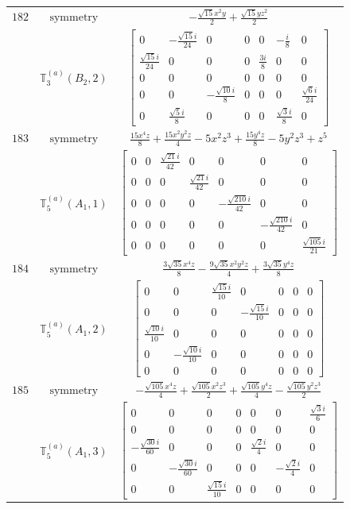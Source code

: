 \documentclass[fleqn,8pt,landscape]{jsarticle}
\begin{document}
\begin{longtable}{ccc}
$ 182 $ & $ \text{symmetry} $ & $ - \frac{\sqrt{15} x^{2} y}{2} + \frac{\sqrt{15} y z^{2}}{2} $ \\
$  $ & $ \mathbb{T}_{3}^{(a)}(B_{2},2) $ & $ \begin{bmatrix} 0 & - \frac{\sqrt{15} i}{24} & 0 & 0 & 0 & - \frac{i}{8} & 0 \\ \frac{\sqrt{15} i}{24} & 0 & 0 & 0 & \frac{3 i}{8} & 0 & 0 \\ 0 & 0 & 0 & 0 & 0 & 0 & 0 \\ 0 & 0 & - \frac{\sqrt{10} i}{8} & 0 & 0 & 0 & \frac{\sqrt{6} i}{24} \\ 0 & \frac{\sqrt{5} i}{8} & 0 & 0 & 0 & \frac{\sqrt{3} i}{8} & 0 \end{bmatrix} $ \\ \hline
$ 183 $ & $ \text{symmetry} $ & $ \frac{15 x^{4} z}{8} + \frac{15 x^{2} y^{2} z}{4} - 5 x^{2} z^{3} + \frac{15 y^{4} z}{8} - 5 y^{2} z^{3} + z^{5} $ \\
$  $ & $ \mathbb{T}_{5}^{(a)}(A_{1},1) $ & $ \begin{bmatrix} 0 & 0 & \frac{\sqrt{21} i}{42} & 0 & 0 & 0 & 0 \\ 0 & 0 & 0 & \frac{\sqrt{21} i}{42} & 0 & 0 & 0 \\ 0 & 0 & 0 & 0 & - \frac{\sqrt{210} i}{42} & 0 & 0 \\ 0 & 0 & 0 & 0 & 0 & - \frac{\sqrt{210} i}{42} & 0 \\ 0 & 0 & 0 & 0 & 0 & 0 & \frac{\sqrt{105} i}{21} \end{bmatrix} $ \\ \hline
$ 184 $ & $ \text{symmetry} $ & $ \frac{3 \sqrt{35} x^{4} z}{8} - \frac{9 \sqrt{35} x^{2} y^{2} z}{4} + \frac{3 \sqrt{35} y^{4} z}{8} $ \\
$  $ & $ \mathbb{T}_{5}^{(a)}(A_{1},2) $ & $ \begin{bmatrix} 0 & 0 & \frac{\sqrt{15} i}{10} & 0 & 0 & 0 & 0 \\ 0 & 0 & 0 & - \frac{\sqrt{15} i}{10} & 0 & 0 & 0 \\ \frac{\sqrt{10} i}{10} & 0 & 0 & 0 & 0 & 0 & 0 \\ 0 & - \frac{\sqrt{10} i}{10} & 0 & 0 & 0 & 0 & 0 \\ 0 & 0 & 0 & 0 & 0 & 0 & 0 \end{bmatrix} $ \\ \hline
$ 185 $ & $ \text{symmetry} $ & $ - \frac{\sqrt{105} x^{4} z}{4} + \frac{\sqrt{105} x^{2} z^{3}}{2} + \frac{\sqrt{105} y^{4} z}{4} - \frac{\sqrt{105} y^{2} z^{3}}{2} $ \\
$  $ & $ \mathbb{T}_{5}^{(a)}(A_{1},3) $ & $ \begin{bmatrix} 0 & 0 & 0 & 0 & 0 & 0 & \frac{\sqrt{3} i}{6} \\ 0 & 0 & 0 & 0 & 0 & 0 & 0 \\ - \frac{\sqrt{30} i}{60} & 0 & 0 & 0 & \frac{\sqrt{2} i}{4} & 0 & 0 \\ 0 & - \frac{\sqrt{30} i}{60} & 0 & 0 & 0 & - \frac{\sqrt{2} i}{4} & 0 \\ 0 & 0 & \frac{\sqrt{15} i}{10} & 0 & 0 & 0 & 0 \end{bmatrix} $ \\ \hline

\end{longtable}
\end{document}

